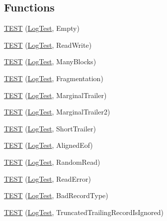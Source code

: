 \subsection*{Functions}
\begin{DoxyCompactItemize}
\item 
\hyperlink{namespaceleveldb_1_1log_ab8a02b9419477420eca51cfd47d5f172}{T\+E\+S\+T} (\hyperlink{classleveldb_1_1log_1_1_log_test}{Log\+Test}, Empty)
\item 
\hyperlink{namespaceleveldb_1_1log_aabca07adceffd87baf38b81665d92bb4}{T\+E\+S\+T} (\hyperlink{classleveldb_1_1log_1_1_log_test}{Log\+Test}, Read\+Write)
\item 
\hyperlink{namespaceleveldb_1_1log_a60249ea325a8656fdc31898d7c5f4ad9}{T\+E\+S\+T} (\hyperlink{classleveldb_1_1log_1_1_log_test}{Log\+Test}, Many\+Blocks)
\item 
\hyperlink{namespaceleveldb_1_1log_ac15e5779ff43d83522727b8cc44882a2}{T\+E\+S\+T} (\hyperlink{classleveldb_1_1log_1_1_log_test}{Log\+Test}, Fragmentation)
\item 
\hyperlink{namespaceleveldb_1_1log_a9721de928c01ac50b5770b8b4cbb98e1}{T\+E\+S\+T} (\hyperlink{classleveldb_1_1log_1_1_log_test}{Log\+Test}, Marginal\+Trailer)
\item 
\hyperlink{namespaceleveldb_1_1log_aad9c4a11c674359115f4d16c97e33ad1}{T\+E\+S\+T} (\hyperlink{classleveldb_1_1log_1_1_log_test}{Log\+Test}, Marginal\+Trailer2)
\item 
\hyperlink{namespaceleveldb_1_1log_a1a1972ff9493353cfb4546cacd33ddb7}{T\+E\+S\+T} (\hyperlink{classleveldb_1_1log_1_1_log_test}{Log\+Test}, Short\+Trailer)
\item 
\hyperlink{namespaceleveldb_1_1log_a55d554f8c576d9d4d99e35d3fe0c169f}{T\+E\+S\+T} (\hyperlink{classleveldb_1_1log_1_1_log_test}{Log\+Test}, Aligned\+Eof)
\item 
\hyperlink{namespaceleveldb_1_1log_a52d33034be964c0d0e40efdf4b423452}{T\+E\+S\+T} (\hyperlink{classleveldb_1_1log_1_1_log_test}{Log\+Test}, Random\+Read)
\item 
\hyperlink{namespaceleveldb_1_1log_a47ffd653cde9cb9bc00c0a9914da48fd}{T\+E\+S\+T} (\hyperlink{classleveldb_1_1log_1_1_log_test}{Log\+Test}, Read\+Error)
\item 
\hyperlink{namespaceleveldb_1_1log_a4fd335e6dbc3a27ea10e985387f69d6d}{T\+E\+S\+T} (\hyperlink{classleveldb_1_1log_1_1_log_test}{Log\+Test}, Bad\+Record\+Type)
\item 
\hyperlink{namespaceleveldb_1_1log_aa1e3f8be0b7799bfb21c5c4bf40d22c3}{T\+E\+S\+T} (\hyperlink{classleveldb_1_1log_1_1_log_test}{Log\+Test}, Truncated\+Trailing\+Record\+Is\+Ignored)

\end{DoxyCompactItemize}
